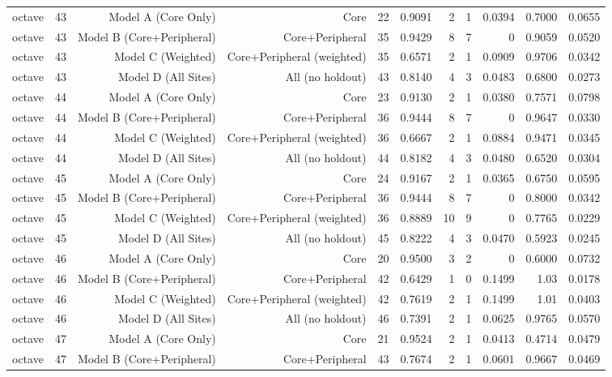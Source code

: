 {\begin{longtable}{lrrrrrrrrrr}
  octave & 43 & Model A (Core Only) & Core & 22 & 0.9091 & 2 & 1 & 0.0394 & 0.7000 & 0.0655 \\
  octave & 43 & Model B (Core+Peripheral) & Core+Peripheral & 35 & 0.9429 & 8 & 7 & 0 & 0.9059 & 0.0520 \\
  octave & 43 & Model C (Weighted) & Core+Peripheral (weighted) & 35 & 0.6571 & 2 & 1 & 0.0909 & 0.9706 & 0.0342 \\
  octave & 43 & Model D (All Sites) & All (no holdout) & 43 & 0.8140 & 4 & 3 & 0.0483 & 0.6800 & 0.0273 \\
  octave & 44 & Model A (Core Only) & Core & 23 & 0.9130 & 2 & 1 & 0.0380 & 0.7571 & 0.0798 \\
  octave & 44 & Model B (Core+Peripheral) & Core+Peripheral & 36 & 0.9444 & 8 & 7 & 0 & 0.9647 & 0.0330 \\
  octave & 44 & Model C (Weighted) & Core+Peripheral (weighted) & 36 & 0.6667 & 2 & 1 & 0.0884 & 0.9471 & 0.0345 \\
  octave & 44 & Model D (All Sites) & All (no holdout) & 44 & 0.8182 & 4 & 3 & 0.0480 & 0.6520 & 0.0304 \\
  octave & 45 & Model A (Core Only) & Core & 24 & 0.9167 & 2 & 1 & 0.0365 & 0.6750 & 0.0595 \\
  octave & 45 & Model B (Core+Peripheral) & Core+Peripheral & 36 & 0.9444 & 8 & 7 & 0 & 0.8000 & 0.0342 \\
  octave & 45 & Model C (Weighted) & Core+Peripheral (weighted) & 36 & 0.8889 & 10 & 9 & 0 & 0.7765 & 0.0229 \\
  octave & 45 & Model D (All Sites) & All (no holdout) & 45 & 0.8222 & 4 & 3 & 0.0470 & 0.5923 & 0.0245 \\
  octave & 46 & Model A (Core Only) & Core & 20 & 0.9500 & 3 & 2 & 0 & 0.6000 & 0.0732 \\
  octave & 46 & Model B (Core+Peripheral) & Core+Peripheral & 42 & 0.6429 & 1 & 0 & 0.1499 & 1.03 & 0.0178 \\
  octave & 46 & Model C (Weighted) & Core+Peripheral (weighted) & 42 & 0.7619 & 2 & 1 & 0.1499 & 1.01 & 0.0403 \\
  octave & 46 & Model D (All Sites) & All (no holdout) & 46 & 0.7391 & 2 & 1 & 0.0625 & 0.9765 & 0.0570 \\
  octave & 47 & Model A (Core Only) & Core & 21 & 0.9524 & 2 & 1 & 0.0413 & 0.4714 & 0.0479 \\
  octave & 47 & Model B (Core+Peripheral) & Core+Peripheral & 43 & 0.7674 & 2 & 1 & 0.0601 & 0.9667 & 0.0469 \\

\end{longtable}}
